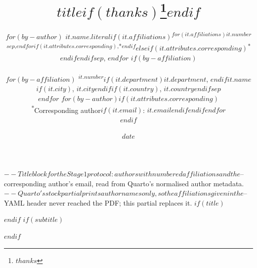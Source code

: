 $-- Title block for the Stage 1 protocol: authors with numbered affiliations and the
$-- corresponding author's email, read from Quarto's normalised author metadata.
$-- Quarto's stock partial prints author names only, so the affiliations given in the
$-- YAML header never reached the PDF; this partial replaces it.
$if(title)$
\title{$title$$if(thanks)$\thanks{$thanks$}$endif$}
$endif$
$if(subtitle)$
\usepackage{etoolbox}
\makeatletter
\providecommand{\subtitle}[1]{%
  \apptocmd{\@title}{\par {\large #1 \par}}{}{}
}
\makeatother
\subtitle{$subtitle$}
$endif$
\author{%
$for(by-author)$
$it.name.literal$$if(it.affiliations)$\textsuperscript{$for(it.affiliations)$$it.number$$sep$,$endfor$$if(it.attributes.corresponding)$,*$endif$}$else$$if(it.attributes.corresponding)$\textsuperscript{*}$endif$$endif$$sep$, %
$endfor$
$if(by-affiliation)$
\\[1.5ex]
\begin{minipage}{\textwidth}\centering\normalsize{}
$for(by-affiliation)$
\textsuperscript{$it.number$}$if(it.department)$$it.department$, $endif$$it.name$$if(it.city)$, $it.city$$endif$$if(it.country)$, $it.country$$endif$$sep$\\
$endfor$
$for(by-author)$$if(it.attributes.corresponding)$\\[0.5ex]\textsuperscript{*}Corresponding author$if(it.email)$: $it.email$$endif$$endif$$endfor$
\end{minipage}
$endif$
}
\date{$date$}
